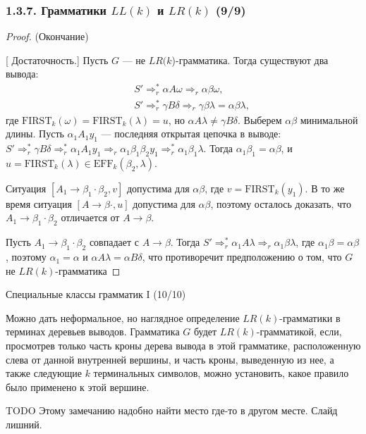 \documentclass[mathserif,12pt,aspectratio=169]{beamer}
\def\proofsection#1{\par{\color{brown}\sffamily\small  [\;}{\sffamily\small\color{brown} #1}{\sffamily\small\color{brown}\;]}\;}
\def\TODO#1{{\color{gray} TODO {#1}}}
\begin{document}
\begin{frame}
\frametitle{1.3.7. Грамматики $LL(k)$ и $LR(k)$ (9/9)}
\begin{proof} (Окончание)
\proofsection{Достаточность.}
Пусть $G$ --- не $LR(k$)-грамматика.  
Тогда существуют два вывода:
\[
\begin{aligned}
\quad & S' \Rightarrow_r^* \alpha A \omega \Rightarrow_r \alpha \beta \omega,\\
\quad & S' \Rightarrow^*_{r} \gamma B \delta \Rightarrow_{r} \gamma \beta \lambda= \alpha \beta \lambda,
\end{aligned}
\]
где $\mathrm{FIRST}_k(\omega) = \mathrm{FIRST}_k(\lambda) = u$,
но $\alpha A \lambda \ne \gamma B \delta$.
Выберем $\alpha \beta$ минимальной длины.  
Пусть $\alpha_1 A_1 y_1$ — последняя открытая цепочка в выводе:
\(
S' \Rightarrow_r^* \gamma B \delta \Rightarrow_r^* \alpha_1 A_1 y_1
\Rightarrow_r \alpha_1 \beta_1 \beta_2 y_1 \Rightarrow_r^* \alpha_1 \beta_1 \lambda.
\)
Тогда $\alpha_1 \beta_1 = \alpha \beta$, и
$u = \mathrm{FIRST}_k(\lambda) \in \mathrm{EFF}_k(\beta_2, \lambda)$. 

Ситуация \([A_1 \to \beta_1 \cdot \beta_2, v]\) допустима для \(\alpha \beta\), где \(v = \mathrm{FIRST}_k(y_1)\).
В то же время ситуация \([A \to \beta \cdot , u]\) допустима для \(\alpha \beta\), поэтому осталось доказать, что \(A_1 \to \beta_1 \cdot \beta_2\) отличается от \(A \to \beta \). 

Пусть \(A_1 \to \beta_1 \cdot \beta_2\) совпадает с \(A \to \beta \). Тогда 
\(
S' \Rightarrow_r^*  \alpha_1 A \lambda
\Rightarrow_r \alpha_1 \beta \lambda
\), где \(\alpha_1 \beta = \alpha \beta \), поэтому \(\alpha_1 = \alpha\) и \(\alpha A \lambda = \alpha B \delta \), что противоречит предположению о том, что \(G\) не $LR(k)$-грамматика 
\end{proof}
\end{frame}

\begin{frame}{Специальные классы грамматик I (10/10)}
\begin{remark}
     Можно дать неформальное, но наглядное определение \(LR(k)\)-грамматики в терминах деревьев выводов. Грамматика \(G\) будет \(LR(k)\)-грамматикой, если, просмотрев только часть кроны дерева вывода в этой грамматике, расположенную слева от данной внутренней вершины, и часть кроны, выведенную из нее, а также следующие \(k\) терминальных символов, можно установить, какое правило было применено к этой вершине.
\end{remark}

\TODO{ Этому замечанию надобно найти место где-то в другом месте. Слайд лишний. } 
 
\end{frame}
\end{document}

